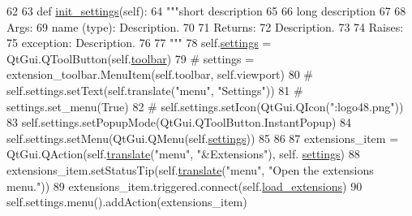 \begin{DoxyCode}
62 
63     \textcolor{keyword}{def }\hyperlink{classcommotion__client_1_1GUI_1_1toolbar__builder_1_1ToolBar_a075b6709f65ef1aeaca34c69dd305379}{init\_settings}(self):
64         \textcolor{stringliteral}{"""short description}
65 \textcolor{stringliteral}{        }
66 \textcolor{stringliteral}{        long description}
67 \textcolor{stringliteral}{        }
68 \textcolor{stringliteral}{        Args:}
69 \textcolor{stringliteral}{        name (type): Description.}
70 \textcolor{stringliteral}{        }
71 \textcolor{stringliteral}{        Returns:}
72 \textcolor{stringliteral}{        Description.}
73 \textcolor{stringliteral}{        }
74 \textcolor{stringliteral}{        Raises:}
75 \textcolor{stringliteral}{        exception: Description.}
76 \textcolor{stringliteral}{        }
77 \textcolor{stringliteral}{        """}
78         self.\hyperlink{classcommotion__client_1_1GUI_1_1toolbar__builder_1_1ToolBar_a9d096d6696d3dbce5a61de16ab7206d2}{settings} = QtGui.QToolButton(self.\hyperlink{classcommotion__client_1_1GUI_1_1toolbar__builder_1_1ToolBar_a604f08b7bf5e7da96522fa20892aa68a}{toolbar})
79         \textcolor{comment}{#        settings = extension\_toolbar.MenuItem(self.toolbar, self.viewport)}
80 \textcolor{comment}{#        self.settings.setText(self.translate("menu", "Settings"))}
81         \textcolor{comment}{#       settings.set\_menu(True)}
82 \textcolor{comment}{#        self.settings.setIcon(QtGui.QIcon(":logo48.png"))}
83         self.settings.setPopupMode(QtGui.QToolButton.InstantPopup)
84         self.settings.setMenu(QtGui.QMenu(self.\hyperlink{classcommotion__client_1_1GUI_1_1toolbar__builder_1_1ToolBar_a9d096d6696d3dbce5a61de16ab7206d2}{settings}))
85  
86         
87         extensions\_item = QtGui.QAction(self.\hyperlink{classcommotion__client_1_1GUI_1_1toolbar__builder_1_1ToolBar_a1432d3836ec381328b3eb4a4491f7b96}{translate}(\textcolor{stringliteral}{"menu"}, \textcolor{stringliteral}{"&Extensions"}), self.
      \hyperlink{classcommotion__client_1_1GUI_1_1toolbar__builder_1_1ToolBar_a9d096d6696d3dbce5a61de16ab7206d2}{settings})
88         extensions\_item.setStatusTip(self.\hyperlink{classcommotion__client_1_1GUI_1_1toolbar__builder_1_1ToolBar_a1432d3836ec381328b3eb4a4491f7b96}{translate}(\textcolor{stringliteral}{"menu"}, \textcolor{stringliteral}{"Open the extensions menu."}))
89         extensions\_item.triggered.connect(self.\hyperlink{classcommotion__client_1_1GUI_1_1toolbar__builder_1_1ToolBar_a0a0d3e80c3d039cfd2cc5d445b06b3c7}{load\_extensions})
90         self.settings.menu().addAction(extensions\_item)

\end{DoxyCode}
